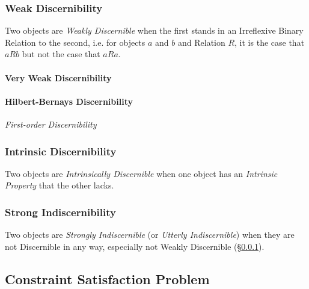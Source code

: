 \subsubsection{Weak Discernibility}\label{sec:weak_discernibility}

Two objects are \emph{Weakly Discernible} when the first stands in an
Irreflexive Binary Relation to the second, i.e. for objects $a$ and
$b$ and Relation $R$, it is the case that $aRb$ but not the case that
$aRa$.

\paragraph{Very Weak Discernibility}\label{sec:very_weak_discernibility}\hfill

\paragraph{Hilbert-Bernays Discernibility}\hfill
\label{sec:hilbert_bernays_discernibility}

\emph{First-order Discernibility}


\subsubsection{Intrinsic Discernibility}\label{sec:intrinsic_discernibility}


Two objects are \emph{Intrinsically Discernible} when one object has
an \emph{Intrinsic Property} that the other lacks.



\subsubsection{Strong Indiscernibility}\label{sec:strong_indiscernibility}

Two objects are \emph{Strongly Indiscernible} (or \emph{Utterly
  Indiscernible}) when they are not Discernible in any way, especially
not Weakly Discernible (\S\ref{sec:weak_discernibility}).



\subsection{Constraint Satisfaction Problem}
\label{sec:constraint_satisfaction}

